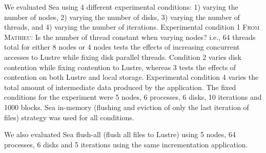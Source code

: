 \documentclass[10pt,journal,compsoc]{IEEEtran}
\newcommand{\MD}[1]{\color{magenta}\textsc{From Mathieu}: #1\xspace\color{black}}
\begin{document}
                                                                                   
      We evaluated Sea using 4 different experimental conditions: 1) varying the
      number of nodes, 2) varying the number of disks, 3) varying the number of
      threads, and 4) varying the number of iterations. Experimental condition 1 \MD{Is the number of thread constant when varying nodes? i.e., 64 threads total for either 8 nodes or 4 nodes}
      tests the effects of increasing concurrent accesses to Lustre while fixing
      disk parallel threads. Condition 2 varies disk contention while fixing
      contention to Lustre, whereas 3 tests the effects of contention on both
      Lustre and local storage. Experimental condition 4 varies the total amount
      of intermediate data produced by the application. The fixed conditions for
      the experiment were 5 nodes, 6 processes, 6 disks, 10 iterations and 1000
      blocks. Sea in-memory (flushing and eviction of only the last iteration of
      files) strategy was used for all conditions.
      
      We also evaluated Sea flush-all (flush all files to Lustre) using 5 nodes,
      64 processes, 6 disks and 5 iterations using the same incrementation
      application.
\end{document}
